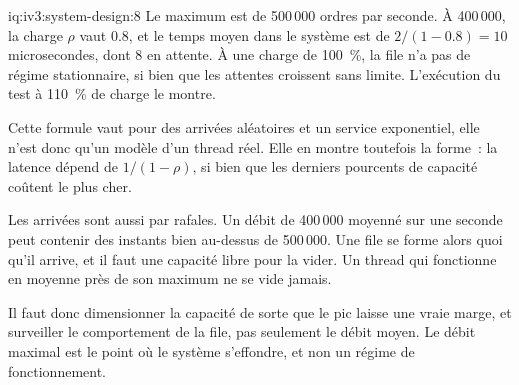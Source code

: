 \begin{solution}{iq:iv3:system-design:8}
Le maximum est de 500\,000 ordres par seconde. À 400\,000, la charge $\rho$ vaut 0.8, et le temps moyen dans le système est de $2 / (1 - 0.8) = 10$ microsecondes, dont 8 en attente. À une charge de 100~\%, la file n'a pas de régime stationnaire, si bien que les attentes croissent sans limite. L'exécution du test à 110~\% de charge le montre.

Cette formule vaut pour des arrivées aléatoires et un service exponentiel, elle n'est donc qu'un modèle d'un thread réel. Elle en montre toutefois la forme~: la latence dépend de $1 / (1 - \rho)$, si bien que les derniers pourcents de capacité coûtent le plus cher.

Les arrivées sont aussi par rafales. Un débit de 400\,000 moyenné sur une seconde peut contenir des instants bien au-dessus de 500\,000. Une file se forme alors quoi qu'il arrive, et il faut une capacité libre pour la vider. Un thread qui fonctionne en moyenne près de son maximum ne se vide jamais.

Il faut donc dimensionner la capacité de sorte que le pic laisse une vraie marge, et surveiller le comportement de la file, pas seulement le débit moyen. Le débit maximal est le point où le système s'effondre, et non un régime de fonctionnement.

\end{solution}

